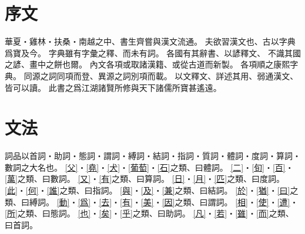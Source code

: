 \chapter*{序文}
華夏・雞林・扶桑・南越之中、書生齊嘗與漢文流通。
夫欲習漢文也、古以字典爲寶及今。
字典雖有字彙之釋、而未有詞。
各國有其辭書、以諺釋文、
不識其國之諺、畫中之餅也爾。
內文各項或取諸漢籍、或從古道而新製。
各項順之康熙字典。
同源之詞同項而登、異源之詞別項而載。
以文釋文、詳述其用、弱通漢文、皆可以讀。
此書之爲江湖諸賢所修與天下諸儒所寶甚遙遠。
\chapter*{文法}
詞品以首詞・助詞・態詞・謂詞・縛詞・結詞・指詞・質詞・體詞・度詞・算詞・數詞之大名也。
\cref{父}・\cref{堯}・\cref{犬}・\cref{葡萄}・\cref{石}之類、曰體詞。
\cref{二}・\cref{旬}・\cref{百}・\cref{萬}之類、曰數詞。
\cref{又}・\cref{有}之類、曰算詞。
\cref{日}・\cref{月}・\cref{匹}之類、曰度詞。
\cref{此}・\cref{何}・\cref{誰}之類、曰指詞。
\cref{與}・\cref{及}・\cref{兼}之類、曰結詞。
\cref{於}・\cref{猶}・\cref{曰}之類、曰縛詞。
\cref{動}・\cref{爲}・\cref{去}・\cref{有}・\cref{美}・\cref{因}之類、曰謂詞。
\cref{相}・\cref{使}・\cref{遭}・\cref{所}之類、曰態詞。
\cref{也}・\cref{矣}・\cref{乎}之類、曰助詞。
\cref{凡}・\cref{若}・\cref{雖}・\cref{而}之類、曰首詞。
